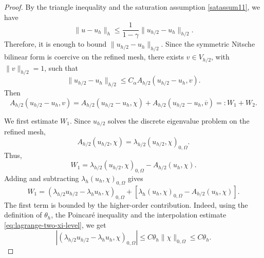 \documentclass[10pt,a4paper]{amsart}
\begin{document}
\begin{proof}
By the triangle inequality and the saturation assumption \eqref{satassum11}, we have
\[
   \|u-u_h\|_h \leq \frac{1}{1-\gamma}\|u_{h/2}-u_h\|_{h/2}.
\]
Therefore, it is enough to bound $\|u_{h/2}-u_h\|_{h/2}$. Since the symmetric Nitsche
bilinear form is coercive on the refined mesh, there exists $v\in V_{h/2}$, with
$\|v\|_{h/2}=1$, such that
\[
   \|u_{h/2}-u_h\|_{h/2} \leq C_\alpha A_{h/2}(u_{h/2}-u_h,v).
\]
Then
\begin{equation}\label{releq11}
A_{h/2}(u_{h/2}-u_h,v) =A_{h/2}(u_{h/2}-u_h,\chi) + A_{h/2}(u_{h/2}-u_h,\overline{v})=: W_1+W_2.
\end{equation}

We first estimate $W_1$. Since $u_{h/2}$ solves the discrete eigenvalue problem on
the refined mesh,
\[
   A_{h/2}(u_{h/2},\chi) = \lambda_{h/2}(u_{h/2},\chi)_{0,\Omega}.
\]
Thus,
\[
   W_1 = \lambda_{h/2}(u_{h/2},\chi)_{0,\Omega} - A_{h/2}(u_h,\chi).
\]
Adding and subtracting $\lambda_h(u_h,\chi)_{0,\Omega}$ gives
\[
   W_1 = (\lambda_{h/2}u_{h/2}-\lambda_hu_h,\chi)_{0,\Omega} + \left[\lambda_h(u_h,\chi)_{0,\Omega} -  A_{h/2}(u_h,\chi) \right].
\]
The first term is bounded by the higher-order contribution. Indeed, using the
definition of $\theta_h$, the Poincar\'e inequality and the interpolation estimate
\eqref{eq:lagrange-two-xi-level}, we get
\[
   |(\lambda_{h/2}u_{h/2}-\lambda_hu_h,\chi)_{0,\Omega}| \leq C\theta_h\|\chi\|_{0,\Omega} \leq  C\theta_h.
\]


\end{proof}
\end{document}
